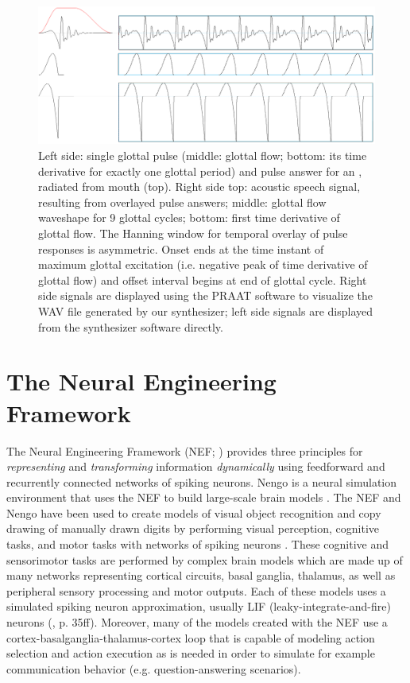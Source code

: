 \documentclass[conference]{IEEEtran}
\let\ipa\textipa
\begin{document}
\begin{figure}[!t]
  \includegraphics[width=\columnwidth]{signal1234}
  \caption{Left side: single glottal pulse (middle: glottal flow;
    bottom: its time derivative for exactly one glottal period) and
    pulse answer for an \ipa{[A]}, radiated from mouth (top). Right side
    top: acoustic speech signal, resulting from overlayed pulse
    answers; middle: glottal flow waveshape for 9 glottal cycles;
    bottom: first time derivative of glottal flow. The Hanning window
    for temporal overlay of pulse responses is asymmetric. Onset ends
    at the time instant of maximum glottal excitation (i.e. negative peak
    of time derivative of glottal flow) and offset interval begins at
    end of glottal cycle. Right side signals are displayed using
    the PRAAT software to visualize the WAV file generated by our
    synthesizer; left side signals are displayed from the synthesizer
    software directly.}
\label{fig:signal}
\end{figure}

\section{The Neural Engineering Framework}

The Neural Engineering Framework (NEF; \cite{eliasmith2003})
provides three principles for \textit{representing} and
\textit{transforming} information \textit{dynamically}
using feedforward and recurrently connected networks
of spiking neurons.
Nengo is a neural simulation environment that uses the NEF
to build large-scale brain models \cite{bekolay2014}.
The NEF and Nengo have been used to create models of visual
object recognition and copy drawing of manually drawn digits by
performing visual perception, cognitive tasks, and motor tasks
with networks of spiking neurons \cite{eliasmith2012,eliasmith2013}.
These cognitive and sensorimotor tasks are performed by
complex brain models which are made up of many networks representing
cortical circuits, basal ganglia, thalamus, as well as peripheral
sensory processing and motor outputs.
Each of these models uses a simulated spiking neuron approximation,
usually LIF (leaky-integrate-and-fire) neurons
(\cite{eliasmith2013}, p. 35ff).
Moreover, many of the models created with the NEF
use a cortex-basalganglia-thalamus-cortex loop
that is capable of modeling action
selection and action execution as is needed in order to simulate for
example communication behavior (e.g. question-answering scenarios).
\end{document}

